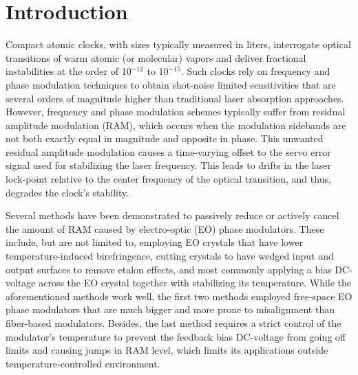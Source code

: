 \documentclass[aip,graphicx]{revtex4-2}
\begin{document}
	\section{Introduction}
	Compact atomic clocks, with sizes typically measured in liters, interrogate optical transitions of warm atomic (or molecular) vapors and deliver fractional instabilities at the order of 10$^{-12}$ to 10$^{-15}$.\cite{Phelps2018,Martin2018,JOKARUS2019} Such clocks rely on frequency and phase modulation techniques to obtain shot-noise limited sensitivities that are several orders of magnitude higher than traditional laser absorption approaches.\cite{Gehrtz1985} However, frequency and phase modulation schemes typically suffer from residual amplitude modulation (RAM), which occurs when the modulation sidebands are not both exactly equal in magnitude and opposite in phase.\cite{Zhang2014} This unwanted residual amplitude modulation causes a time-varying offset to the servo error signal used for stabilizing the laser frequency. This leads to drifts in the laser lock-point relative to the center frequency of the optical transition, and thus, degrades the clock’s stability.
	
	Several methods have been demonstrated to passively reduce or actively cancel the amount of RAM caused by electro-optic (EO) phase modulators. These include, but are not limited to, employing EO crystals that have lower temperature-induced birefringence,\cite{Jin2021} cutting crystals to have wedged input and output surfaces to remove etalon effects,\cite{Bi2019} and most commonly applying a bias DC-voltage across the EO crystal together with stabilizing its temperature.\cite{Zhang2014, Gillot2022} While the aforementioned methods work well, the first two methods employed free-space EO phase modulators that are much bigger and more prone to misalignment than fiber-based modulators. Besides, the last method requires a strict control of the modulator's temperature to prevent the feedback bias DC-voltage from going off limits and causing jumps in RAM level, which limits its applications outside temperature-controlled environment.
	
\end{document}
